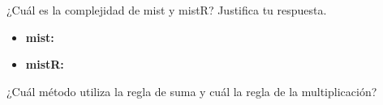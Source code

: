 \documentclass{report}
\begin{document}
\begin{enumerate}
        \newline ¿Cuál es la complejidad de mist y mistR? Justifica tu respuesta.
        \begin{itemize}
            \item \textbf{mist: }
            \item \textbf{mistR: } 
        \end{itemize}
        \newline ¿Cuál método utiliza la regla de suma y cuál la regla de la multiplicación?
    \end{enumerate}
\end{document}
